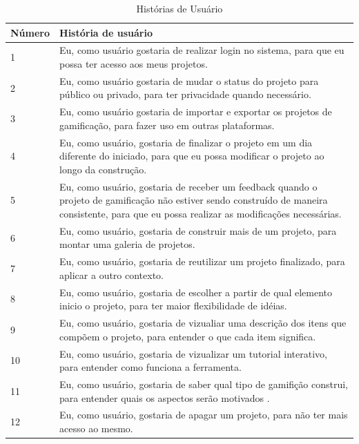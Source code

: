 \begin{table}[!htpb]
\centering
\begin{tabular}{|p{1.5cm}|p{12cm}|} \hline

 Número & História de usuário \\ \hline

 1 & Eu, como usuário gostaria de realizar login no sistema, para que eu possa ter acesso aos meus projetos. \\ \hline

 2 & Eu, como usuário gostaria de mudar o status do projeto para público ou privado,  para ter privacidade quando necessário. \\ \hline

 3 & Eu, como usuário gostaria de importar e exportar os projetos de gamificação, para fazer uso em outras plataformas. \\ \hline

 4 & Eu, como usuário, gostaria de finalizar o projeto em um dia diferente do iniciado, para que eu possa modificar o projeto ao longo da construção. \\ \hline

 5 & Eu, como usuário, gostaria de receber um feedback quando o projeto de gamificação não estiver sendo construído de maneira consistente, para que eu possa realizar as modificações necessárias. \\ \hline

 6 & Eu, como usuário, gostaria de construir mais de um projeto, para montar uma galeria de projetos. \\ \hline

 7 & Eu, como usuário, gostaria de reutilizar um projeto finalizado, para aplicar a outro contexto. \\ \hline

 8 & Eu, como usuário, gostaria de escolher a partir de qual elemento inicio o projeto, para ter maior flexibilidade de idéias. \\ \hline

 9 & Eu, como usuário, gostaria de vizualiar uma descrição dos itens que compõem o projeto, para entender o que cada item significa. \\ \hline

 10 & Eu, como usuário, gostaria de vizualizar um tutorial interativo, para entender como funciona a ferramenta. \\ \hline

 11 & Eu, como usuário, gostaria de saber qual tipo de gamifição construi, para entender quais os aspectos serão motivados . \\ \hline

 12 & Eu, como usuário, gostaria de apagar um projeto, para não ter mais acesso ao mesmo. \\ \hline
\end{tabular}
\caption{Histórias de Usuário\label{tab01}
}
\end{table} 





